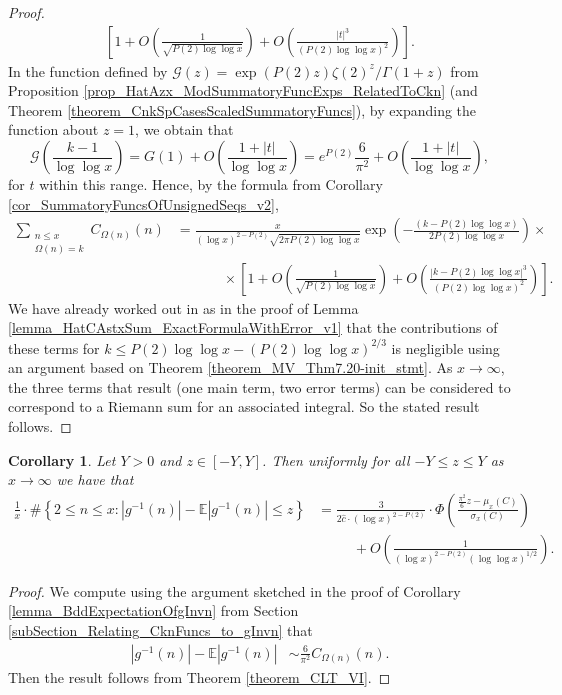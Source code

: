 \documentclass[11pt,reqno,a4letter]{article}
\numberwithin{figure}{section}
\numberwithin{table}{section}
\theoremstyle{plain}
\newtheorem{cor}[theorem]{Corollary}
\numberwithin{theorem}{section}
\theoremstyle{definition}
\begin{document}
\begin{proof}
\begin{align*}
     \left[1 + 
     O\left(\frac{1}{\sqrt{P(2) \log\log x}}\right) + 
     O\left(\frac{|t|^3}{(P(2) \log\log x)^2}\right)\right]. 
\end{align*} 
In the function defined by $\mathcal{G}(z) = \exp(P(2)z) \zeta(2)^{z} / \Gamma(1+z)$ from 
Proposition \ref{prop_HatAzx_ModSummatoryFuncExps_RelatedToCkn} 
(and Theorem \ref{theorem_CnkSpCasesScaledSummatoryFuncs}), by expanding the function about 
$z = 1$, we obtain that 
\[
\mathcal{G}\left(\frac{k-1}{\log\log x}\right) = G(1) + O\left(\frac{1+|t|}{\log\log x}\right) = 
     e^{P(2)} \frac{6}{\pi^2} + O\left(\frac{1+|t|}{\log\log x}\right), 
\]
for $t$ within this range. 
Hence, by the formula from Corollary \ref{cor_SummatoryFuncsOfUnsignedSeqs_v2}, 
\begin{align*}
\sum_{\substack{n \leq x \\ \Omega(n)=k}} C_{\Omega(n)}(n) & = 
     \frac{x}{(\log x)^{2-P(2)} \sqrt{2\pi P(2) \log\log x}} \exp\left(- 
     \frac{(k-P(2)\log\log x)}{2P(2)\log\log x}\right) \times \\ 
     & \phantom{=\qquad} \times 
     \left[ 
     1 + O\left(\frac{1}{\sqrt{P(2) \log\log x}}\right) + 
     O\left(\frac{|k-P(2)\log\log x|^3}{(P(2) \log\log x)^2}\right)\right]. 
\end{align*} 
We have already worked out in as in the proof of 
Lemma \ref{lemma_HatCAstxSum_ExactFormulaWithError_v1} that 
the contributions of these terms for $k \leq P(2)\log\log x - (P(2)\log\log x)^{2/3}$ 
is negligible using an argument based on Theorem \ref{theorem_MV_Thm7.20-init_stmt}. 
As $x \rightarrow \infty$, the three terms that result (one main term, two error terms) 
can be considered to correspond to a Riemann sum for an associated integral. 
So the stated result follows. 
\end{proof} 

\begin{cor} 
\label{cor_CLT_VII} 
Let $Y > 0$ and $z \in [-Y, Y]$. 
Then uniformly for all $-Y \leq z \leq Y$ as $x \rightarrow \infty$ 
we have that 
\begin{align*} 
\frac{1}{x} \cdot \#\left\{2 \leq n \leq x:|g^{-1}(n)| - 
     \mathbb{E}|g^{-1}(n)| \leq z\right\} & = 
     \frac{3}{2\widehat{c} \cdot (\log x)^{2-P(2)}} \cdot 
     \Phi\left(\frac{\frac{\pi^2}{6} z - \mu_x(C)}{\sigma_x(C)}\right) \\ 
     & \phantom{=\quad\ } + 
     O\left(\frac{1}{(\log x)^{2-P(2)} (\log\log x)^{1/2}}\right). 
\end{align*} 
\end{cor} 
\begin{proof} 
We compute using the argument sketched in the proof of 
Corollary \ref{lemma_BddExpectationOfgInvn} from 
Section \ref{subSection_Relating_CknFuncs_to_gInvn} that 
\begin{align*} 
|g^{-1}(n)| - \mathbb{E}|g^{-1}(n)| & \sim \frac{6}{\pi^2} C_{\Omega(n)}(n). 
\end{align*} 
Then the result follows from Theorem \ref{theorem_CLT_VI}. 
\end{proof} 
\end{document}
